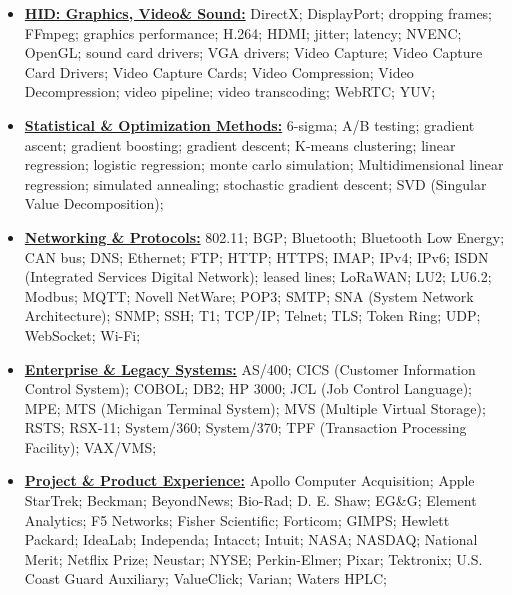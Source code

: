 \documentclass[letterpaper,11pt]{article}
\begin{document}
{\begin{itemize}[leftmargin=0.1in, label={}, itemsep=0pt, parsep=0pt, topsep=0pt, partopsep=0pt]
    Cross-Platform QuickTime;
    Direct2D;
    Fonts and Typography;
    Geometry;
    Glyphs;
    GTK+;
    HTML5 Canvas;
    Java2D;
    JavaFX;
    macOS UI;
    Microsoft GDI (Graphics Device Interface);
    OpenGL;
    Qt;
    Quartz 2D;
    QuickDraw 2D;
    QuickTime 1.x--3.x;
    SVG;
    Swing;
    Windows GUI;
    X11;
\item
    \textbf{\underline{HID: Graphics, Video\& Sound:}} \hspace{0pt}
    DirectX;
    DisplayPort;
    dropping frames;
    FFmpeg;
    graphics performance;
    H.264;
    HDMI;
    jitter;
    latency;
    NVENC;
    OpenGL;
    sound card drivers;
    VGA drivers;
    Video Capture;
    Video Capture Card Drivers;
    Video Capture Cards;
    Video Compression;
    Video Decompression;
    video pipeline;
    video transcoding;
    WebRTC;
    YUV;
\item
    \textbf{\underline{Statistical \& Optimization Methods:}} \hspace{0pt}
    6-sigma;
    A/B testing;
    gradient ascent;
    gradient boosting;
    gradient descent;
    K-means clustering;
    linear regression;
    logistic regression;
    monte carlo simulation;
    Multidimensional linear regression;
    simulated annealing;
    stochastic gradient descent;
    SVD (Singular Value Decomposition);
\item
    \textbf{\underline{Networking \& Protocols:}} \hspace{0pt}
    802.11;
    BGP;
    Bluetooth;
    Bluetooth Low Energy;
    CAN bus;
    DNS;
    Ethernet;
    FTP;
    HTTP;
    HTTPS;
    IMAP;
    IPv4;
    IPv6;
    ISDN (Integrated Services Digital Network);
    leased lines;
    LoRaWAN;
    LU2;
    LU6.2;
    Modbus;
    MQTT;
    Novell NetWare;
    POP3;
    SMTP;
    SNA (System Network Architecture);
    SNMP;
    SSH;
    T1;
    TCP/IP;
    Telnet;
    TLS;
    Token Ring;
    UDP;
    WebSocket;
    Wi-Fi;

\item
    \textbf{\underline{Enterprise \& Legacy Systems:}} \hspace{0pt}
    AS/400;
    CICS (Customer Information Control System);
    COBOL;
    DB2;
    HP 3000;
    JCL (Job Control Language);
    MPE;
    MTS (Michigan Terminal System);
    MVS (Multiple Virtual Storage);
    RSTS;
    RSX-11;
    System/360;
    System/370;
    TPF (Transaction Processing Facility);
    VAX/VMS;

\item
    \textbf{\underline{Project \& Product Experience:}} \hspace{0pt}
    Apollo Computer Acquisition;
    Apple StarTrek;
    Beckman;
    BeyondNews;
    Bio-Rad;
    D. E. Shaw;
    EG\&G;
    Element Analytics;
    F5 Networks;
    Fisher Scientific;
    Forticom;
    GIMPS;
    Hewlett Packard;
    IdeaLab;
    Independa;
    Intacct;
    Intuit;
    NASA;
    NASDAQ;
    National Merit;
    Netflix Prize;
    Neustar;
    NYSE;
    Perkin-Elmer;
    Pixar;
    Tektronix;
    U.S. Coast Guard Auxiliary;
    ValueClick;
    Varian;
    Waters HPLC;


\end{itemize}}
\end{document}
